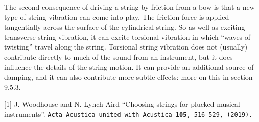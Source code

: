   The second consequence of driving a string by friction from a bow is that a 
  new type of string vibration can come into play. The friction force is 
  applied tangentially across the surface of the cylindrical string. So as well 
  as exciting transverse string vibration, it can excite torsional vibration in 
  which ``waves of twisting'' travel along the string. Torsional string 
  vibration does not (usually) contribute directly to much of the sound from an 
  instrument, but it does influence the details of the string motion. It can 
  provide an additional source of damping, and it can also contribute more 
  subtle effects: more on this in section 9.5.3. 



  \sectionreferences{}[1] J. Woodhouse and N. Lynch-Aird ``Choosing strings for 
  plucked musical instruments''. \tt{}Acta Acustica united with Acustica 
  \textbf{105}, 516-529, (2019)\rm{}.~ 